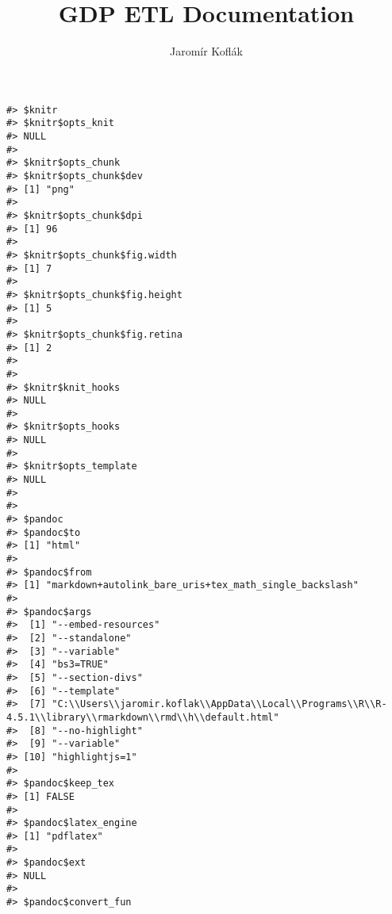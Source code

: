 \documentclass[
]{book}
\title{GDP ETL Documentation}
\author{Jaromír Koflák}
\date{}
\begin{document}
\maketitle

{
\setcounter{tocdepth}{1}
\tableofcontents
}
\begin{verbatim}
#> $knitr
#> $knitr$opts_knit
#> NULL
#> 
#> $knitr$opts_chunk
#> $knitr$opts_chunk$dev
#> [1] "png"
#> 
#> $knitr$opts_chunk$dpi
#> [1] 96
#> 
#> $knitr$opts_chunk$fig.width
#> [1] 7
#> 
#> $knitr$opts_chunk$fig.height
#> [1] 5
#> 
#> $knitr$opts_chunk$fig.retina
#> [1] 2
#> 
#> 
#> $knitr$knit_hooks
#> NULL
#> 
#> $knitr$opts_hooks
#> NULL
#> 
#> $knitr$opts_template
#> NULL
#> 
#> 
#> $pandoc
#> $pandoc$to
#> [1] "html"
#> 
#> $pandoc$from
#> [1] "markdown+autolink_bare_uris+tex_math_single_backslash"
#> 
#> $pandoc$args
#>  [1] "--embed-resources"                                                                                        
#>  [2] "--standalone"                                                                                             
#>  [3] "--variable"                                                                                               
#>  [4] "bs3=TRUE"                                                                                                 
#>  [5] "--section-divs"                                                                                           
#>  [6] "--template"                                                                                               
#>  [7] "C:\\Users\\jaromir.koflak\\AppData\\Local\\Programs\\R\\R-4.5.1\\library\\rmarkdown\\rmd\\h\\default.html"
#>  [8] "--no-highlight"                                                                                           
#>  [9] "--variable"                                                                                               
#> [10] "highlightjs=1"                                                                                            
#> 
#> $pandoc$keep_tex
#> [1] FALSE
#> 
#> $pandoc$latex_engine
#> [1] "pdflatex"
#> 
#> $pandoc$ext
#> NULL
#> 
#> $pandoc$convert_fun

\end{verbatim}
\end{document}

